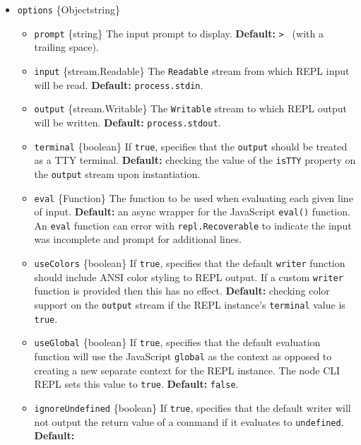 \begin{itemize}
\tightlist
\item
  \texttt{options} \{Object\textbar string\}

  \begin{itemize}
  \tightlist
  \item
    \texttt{prompt} \{string\} The input prompt to display.
    \textbf{Default:}
    \texttt{\textquotesingle{}\textgreater{}\ \textquotesingle{}} (with
    a trailing space).
  \item
    \texttt{input} \{stream.Readable\} The \texttt{Readable} stream from
    which REPL input will be read. \textbf{Default:}
    \texttt{process.stdin}.
  \item
    \texttt{output} \{stream.Writable\} The \texttt{Writable} stream to
    which REPL output will be written. \textbf{Default:}
    \texttt{process.stdout}.
  \item
    \texttt{terminal} \{boolean\} If \texttt{true}, specifies that the
    \texttt{output} should be treated as a TTY terminal.
    \textbf{Default:} checking the value of the \texttt{isTTY} property
    on the \texttt{output} stream upon instantiation.
  \item
    \texttt{eval} \{Function\} The function to be used when evaluating
    each given line of input. \textbf{Default:} an async wrapper for the
    JavaScript \texttt{eval()} function. An \texttt{eval} function can
    error with \texttt{repl.Recoverable} to indicate the input was
    incomplete and prompt for additional lines.
  \item
    \texttt{useColors} \{boolean\} If \texttt{true}, specifies that the
    default \texttt{writer} function should include ANSI color styling
    to REPL output. If a custom \texttt{writer} function is provided
    then this has no effect. \textbf{Default:} checking color support on
    the \texttt{output} stream if the REPL instance's \texttt{terminal}
    value is \texttt{true}.
  \item
    \texttt{useGlobal} \{boolean\} If \texttt{true}, specifies that the
    default evaluation function will use the JavaScript \texttt{global}
    as the context as opposed to creating a new separate context for the
    REPL instance. The node CLI REPL sets this value to \texttt{true}.
    \textbf{Default:} \texttt{false}.
  \item
    \texttt{ignoreUndefined} \{boolean\} If \texttt{true}, specifies
    that the default writer will not output the return value of a
    command if it evaluates to \texttt{undefined}. \textbf{Default:}

\end{itemize}
\end{itemize}
